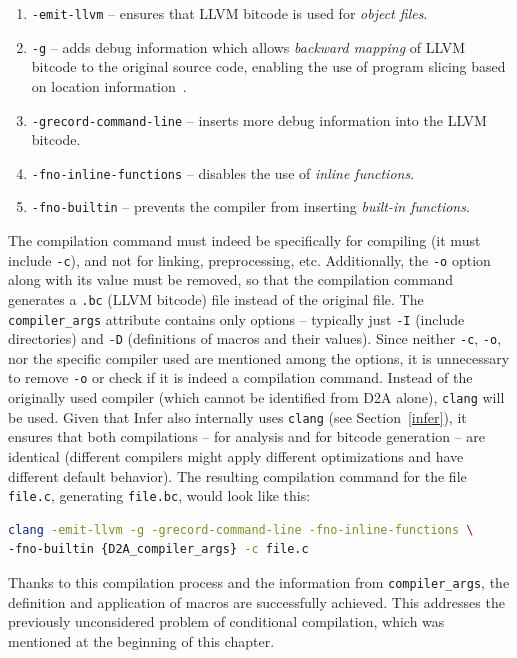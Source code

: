 \begin{enumerate}
    \item \texttt{-emit-llvm} -- ensures that LLVM bitcode is used for \textit{object files}.
    \item \texttt{-g} -- adds debug information which allows \textit{backward mapping} of LLVM bitcode to the original source code, enabling the use of program slicing based on location information~\cite{llvm-slicer-readme}.
    \item \texttt{-grecord-command-line} -- inserts more debug information into the LLVM bitcode.
    \item \texttt{-fno-inline-functions} -- disables the use of \textit{inline functions}.
    \item \texttt{-fno-builtin} -- prevents the compiler from inserting \textit{built-in functions}.
\end{enumerate}

The compilation command must indeed be specifically for compiling (it must include \texttt{-c}), and not for linking, preprocessing, etc. Additionally, the \texttt{-o} option along with its value must be removed, so that the compilation command generates a \texttt{.bc} (LLVM bitcode) file instead of the original file. The \texttt{compiler\_args} attribute contains only options -- typically just \texttt{-I} (include directories) and \texttt{-D} (definitions of macros and their values). Since neither \texttt{-c}, \texttt{-o}, nor the specific compiler used are mentioned among the options, it is unnecessary to remove \texttt{-o} or check if it is indeed a compilation command. Instead of the originally used compiler (which cannot be identified from D2A alone), \texttt{clang} will be used. Given that Infer also internally uses \texttt{clang} (see Section~\ref{infer}), it ensures that both compilations -- for analysis and for bitcode generation -- are identical (different compilers might apply different optimizations and have different default behavior). The resulting compilation command for the file \texttt{file.c}, generating \texttt{file.bc}, would look like this:

\begin{lstlisting}[language=bash, xleftmargin=2em]
clang -emit-llvm -g -grecord-command-line -fno-inline-functions \
-fno-builtin {D2A_compiler_args} -c file.c
\end{lstlisting}

Thanks to this compilation process and the information from \texttt{compiler\_args}, the definition and application of macros are successfully achieved. This addresses the previously unconsidered problem of conditional compilation, which was mentioned at the beginning of this chapter.

